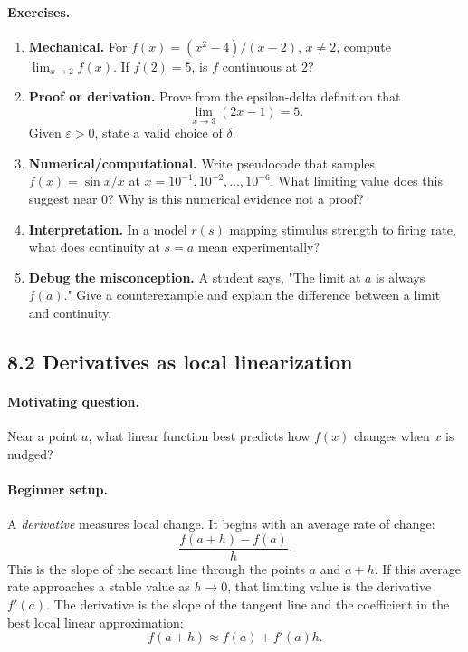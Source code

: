 \paragraph{Exercises.}
\begin{enumerate}[label=\textbf{8.1.\arabic*.}, leftmargin=*]
\item \textbf{Mechanical.} For \(f(x)=(x^2-4)/(x-2)\), \(x\neq 2\), compute \(\lim_{x\to 2}f(x)\). If \(f(2)=5\), is \(f\) continuous at \(2\)?
\item \textbf{Proof or derivation.} Prove from the epsilon-delta definition that
\[
\lim_{x\to 3}(2x-1)=5.
\]
Given \(\varepsilon>0\), state a valid choice of \(\delta\).
\item \textbf{Numerical/computational.} Write pseudocode that samples \(f(x)=\sin x/x\) at \(x=10^{-1},10^{-2},\dots,10^{-6}\). What limiting value does this suggest near \(0\)? Why is this numerical evidence not a proof?
\item \textbf{Interpretation.} In a model \(r(s)\) mapping stimulus strength to firing rate, what does continuity at \(s=a\) mean experimentally?
\item \textbf{Debug the misconception.} A student says, "The limit at \(a\) is always \(f(a)\)." Give a counterexample and explain the difference between a limit and continuity.
\end{enumerate}

\subsection{8.2 Derivatives as local linearization}

\paragraph{Motivating question.}
Near a point \(a\), what linear function best predicts how \(f(x)\) changes when \(x\) is nudged?

\paragraph{Beginner setup.}
A \emph{derivative} measures local change. It begins with an average rate of change:
\[
\frac{f(a+h)-f(a)}{h}.
\]
This is the slope of the secant line through the points \(a\) and \(a+h\). If this average rate approaches a stable value as \(h\to 0\), that limiting value is the derivative \(f'(a)\). The derivative is the slope of the tangent line and the coefficient in the best local linear approximation:
\[
f(a+h)\approx f(a)+f'(a)h.
\]

